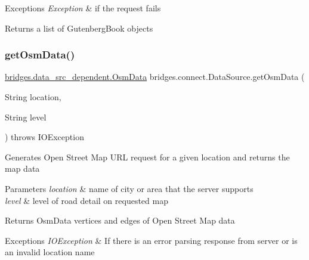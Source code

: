 \begin{DoxyExceptions}{Exceptions}
{\em Exception} & if the request fails\\
\hline
\end{DoxyExceptions}
\begin{DoxyReturn}{Returns}
a list of Gutenberg\+Book objects 
\end{DoxyReturn}
\mbox{\label{classbridges_1_1connect_1_1_data_source_ae82f6a4feff0af28f4aae55986e1560c}} 
\subsubsection{\texorpdfstring{get\+Osm\+Data()}{getOsmData()}\hspace{0.1cm}{\footnotesize\ttfamily [1/2]}}
{\footnotesize\ttfamily \hyperlink{classbridges_1_1data__src__dependent_1_1_osm_data}{bridges.\+data\+\_\+src\+\_\+dependent.\+Osm\+Data} bridges.\+connect.\+Data\+Source.\+get\+Osm\+Data (\begin{DoxyParamCaption}\item[{String}]{location,  }\item[{String}]{level }\end{DoxyParamCaption}) throws I\+O\+Exception}

Generates Open Street Map U\+RL request for a given location and returns the map data 
\begin{DoxyParams}{Parameters}
{\em location} & name of city or area that the server supports \\
\hline
{\em level} & level of road detail on requested map \\
\hline
\end{DoxyParams}
\begin{DoxyReturn}{Returns}
Osm\+Data vertices and edges of Open Street Map data 
\end{DoxyReturn}

\begin{DoxyExceptions}{Exceptions}
{\em I\+O\+Exception} & If there is an error parsing response from server or is an invalid location name \\
\hline
\end{DoxyExceptions}
\mbox{\label{classbridges_1_1connect_1_1_data_source_af68a95ea0608f5bcf0be9e336f748d76}} 
